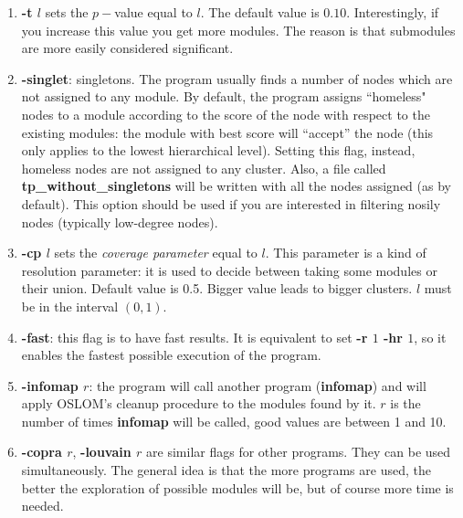 \documentclass[11pt]{article}
\begin{document}
\begin{enumerate}
\item \textbf{-t $l$} sets the $p-$value equal to $l$. The default
  value is $0.10$. Interestingly, if you increase this value you get
  more modules. The reason is that submodules are more easily considered significant.

\item \textbf{-singlet}: singletons. The program usually finds a
  number of nodes which are not assigned to any module. By default, 
  the  program  assigns ``homeless" nodes to a module
  according to the score of the node
  with respect to the existing modules:
the module with best score will ``accept'' the node (this only applies to the lowest hierarchical level).  
Setting this flag, instead, homeless nodes are not assigned to any cluster.
Also, a file called \textbf{tp\_without\_singletons} will be written with all the nodes assigned (as by default). 
This option should be used if you are interested in filtering nosily nodes (typically low-degree nodes).
         
     \item \textbf{-cp $l$} sets the \textit{coverage parameter}  equal to $l$. This parameter is a kind of resolution parameter: it is used to decide between taking some modules or their union. Default value is 0.5. Bigger value leads to bigger clusters. $l$ must be in the interval $(0, 1)$.
  
      \item \textbf{-fast}: this flag is to have fast results. It is equivalent to set  \textbf{-r $1$ -hr $1$}, so it enables the fastest possible execution of the program.
   
   
     \item \textbf{-infomap $r$}: the program will call another program
     (\textbf{infomap}) and will apply OSLOM's cleanup procedure
     to the modules found by it. $r$ is the number of times \textbf{infomap} will be called, good values are between 1 and 10.
    
    
   \item \textbf{-copra $r$}, \textbf{-louvain $r$} are similar flags
     for other programs. They can be used simultaneously. The general
     idea is that the more programs are used, the better the
     exploration of possible modules will be, but of course more time is needed.
   
   
   
   
   
   \end{enumerate}
   
\end{document}
